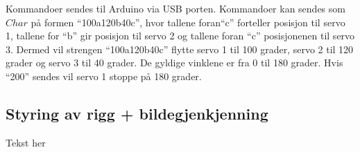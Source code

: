 Kommandoer sendes til Arduino via USB porten. Kommandoer kan sendes som $Char$ på formen ``100a120b40c'', hvor tallene foran``c'' forteller posisjon til servo 1, tallene for ``b'' gir posisjon til servo 2 og tallene foran ``c'' posisjonenen til servo 3. Dermed vil strengen ``100a120b40c'' flytte servo 1 til 100 grader, servo 2 til 120 grader og servo 3 til 40 grader. De gyldige vinklene er fra 0 til 180 grader. Hvis ``200'' sendes vil servo 1 stoppe på 180 grader. 


\subsection{Styring av rigg + bildegjenkjenning}

Tekst her